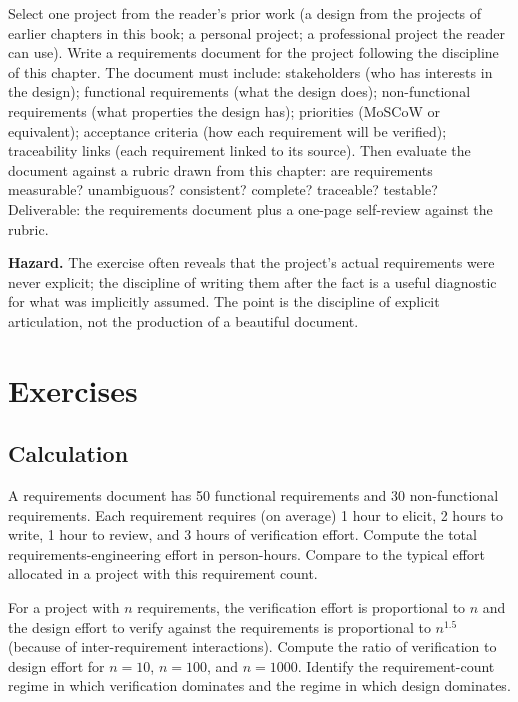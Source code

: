 \begin{project}
Select one project from the reader's prior work (a design from the projects of earlier chapters in this book; a personal project; a professional project the reader can use). Write a requirements document for the project following the discipline of this chapter. The document must include: stakeholders (who has interests in the design); functional requirements (what the design does); non-functional requirements (what properties the design has); priorities (MoSCoW or equivalent); acceptance criteria (how each requirement will be verified); traceability links (each requirement linked to its source). Then evaluate the document against a rubric drawn from this chapter: are requirements measurable? unambiguous? consistent? complete? traceable? testable? Deliverable: the requirements document plus a one-page self-review against the rubric.

\textbf{Hazard.} The exercise often reveals that the project's actual requirements were never explicit; the discipline of writing them after the fact is a useful diagnostic for what was implicitly assumed. The point is the discipline of explicit articulation, not the production of a beautiful document.
\end{project}

\section{Exercises}

\subsection*{Calculation}

\begin{exercise}
A requirements document has 50 functional requirements and 30 non-functional requirements. Each requirement requires (on average) 1 hour to elicit, 2 hours to write, 1 hour to review, and 3 hours of verification effort. Compute the total requirements-engineering effort in person-hours. Compare to the typical effort allocated in a project with this requirement count.
\end{exercise}

\begin{exercise}
For a project with $n$ requirements, the verification effort is proportional to $n$ and the design effort to verify against the requirements is proportional to $n^{1.5}$ (because of inter-requirement interactions). Compute the ratio of verification to design effort for $n = 10$, $n = 100$, and $n = 1000$. Identify the requirement-count regime in which verification dominates and the regime in which design dominates.
\end{exercise}

